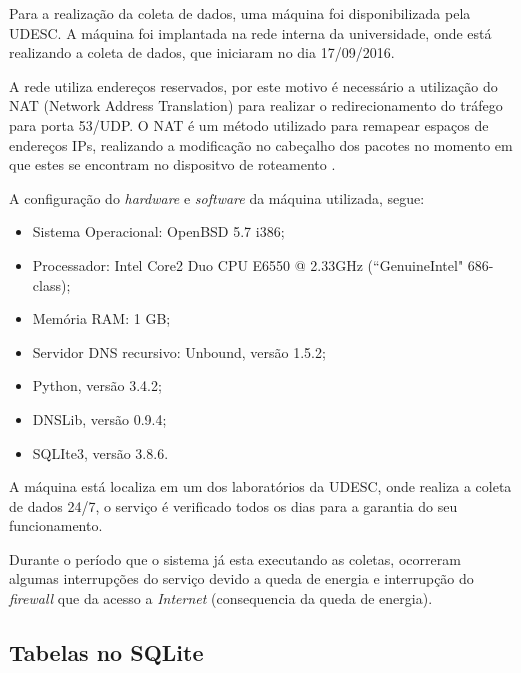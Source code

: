 
Para a realização da coleta de dados, uma máquina foi disponibilizada pela UDESC. A máquina foi implantada na rede interna da universidade, onde está realizando a coleta de dados, que iniciaram no dia 17/09/2016. %

A rede utiliza endereços reservados, por este motivo é necessário a utilização do NAT (Network Address Translation) para realizar o redirecionamento do tráfego para porta 53/UDP. O NAT é um método utilizado para remapear espaços de endereços IPs, realizando a modificação no cabeçalho dos pacotes no momento em que estes se encontram no dispositvo de roteamento \cite{Naugle:1998}. %

A configuração do \textit{hardware} e \textit{software} da máquina utilizada, segue:

\begin{itemize}
    \item Sistema Operacional: OpenBSD 5.7 i386;
    \item Processador: Intel Core2 Duo CPU E6550 @ 2.33GHz (``GenuineIntel" 686-class);
    \item Memória RAM: 1 GB;
    \item Servidor DNS recursivo: Unbound, versão 1.5.2;
    \item Python, versão 3.4.2;
    \item DNSLib, versão 0.9.4;
    \item SQLIte3, versão 3.8.6.
\end{itemize}


A máquina está localiza em um dos laboratórios da UDESC, onde realiza a coleta de dados 24/7, o serviço é verificado todos os dias para a garantia do seu funcionamento.

Durante o período que o sistema já esta executando as coletas, ocorreram algumas interrupções do serviço devido a queda de energia e interrupção do \textit{firewall} que da acesso a \textit{Internet} (consequencia da queda de energia).

\subsection{Tabelas no SQLite}



